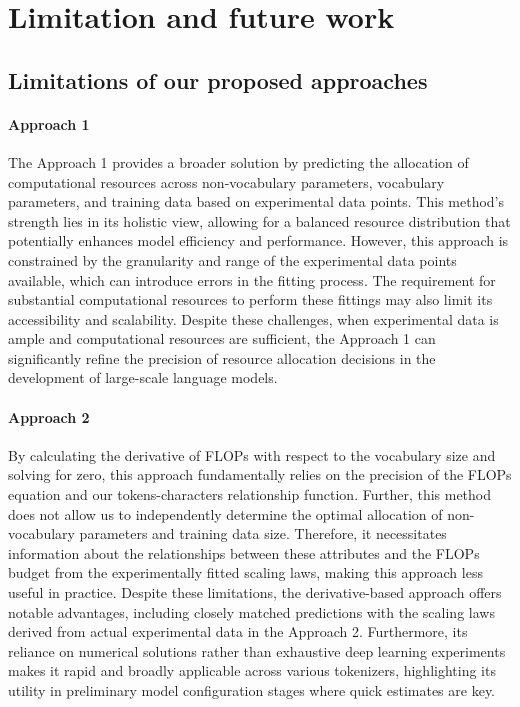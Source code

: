 \section{Limitation and future work}
\label{append:limit}

\subsection{Limitations of our proposed approaches}

\paragraph{Approach 1}
The Approach 1 provides a broader solution by predicting the allocation of computational resources across non-vocabulary parameters, vocabulary parameters, and training data based on experimental data points. This method's strength lies in its holistic view, allowing for a balanced resource distribution that potentially enhances model efficiency and performance. However, this approach is constrained by the granularity and range of the experimental data points available, which can introduce errors in the fitting process. The requirement for substantial computational resources to perform these fittings may also limit its accessibility and scalability. Despite these challenges, when experimental data is ample and computational resources are sufficient, the Approach 1 can significantly refine the precision of resource allocation decisions in the development of large-scale language models.

\paragraph{Approach 2} 
By calculating the derivative of FLOPs with respect to the vocabulary size and solving for zero, this approach fundamentally relies on the precision of the FLOPs equation and our tokens-characters relationship function. Further, this method does not allow us to independently determine the optimal allocation of non-vocabulary parameters and training data size. Therefore, it necessitates information about the relationships between these attributes and the FLOPs budget from the experimentally fitted scaling laws, making this approach less useful in practice. Despite these limitations, the derivative-based approach offers notable advantages, including closely matched predictions with the scaling laws derived from actual experimental data in the Approach 2. Furthermore, its reliance on numerical solutions rather than exhaustive deep learning experiments makes it rapid and broadly applicable across various tokenizers, highlighting its utility in preliminary model configuration stages where quick estimates are key.


